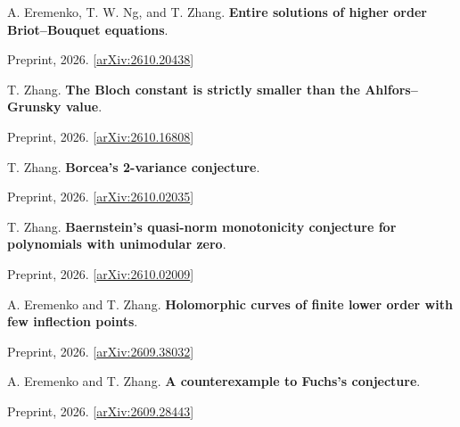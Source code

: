 \documentclass[11pt,letterpaper]{article}
\begin{document}
\begin{enumerate}[label={[\arabic*]},series=preprints]
\raggedright

\item \begin{minipage}[t]{\linewidth}\raggedright A. Eremenko, T. W. Ng, and T. Zhang. \textbf{Entire solutions of higher order Briot--Bouquet equations}.\par Preprint, 2026. [\href{https://arxiv.org/abs/2610.20438}{arXiv:2610.20438}]\end{minipage}

\item \begin{minipage}[t]{\linewidth}\raggedright T. Zhang. \textbf{The Bloch constant is strictly smaller than the Ahlfors--Grunsky value}.\par Preprint, 2026. [\href{https://arxiv.org/abs/2610.16808}{arXiv:2610.16808}]\end{minipage}

\item \begin{minipage}[t]{\linewidth}\raggedright T. Zhang. \textbf{Borcea's 2-variance conjecture}.\par Preprint, 2026. [\href{https://arxiv.org/abs/2610.02035}{arXiv:2610.02035}]\end{minipage}

\item \begin{minipage}[t]{\linewidth}\raggedright T. Zhang. \textbf{Baernstein's quasi-norm monotonicity conjecture for polynomials with unimodular zero}.\par Preprint, 2026. [\href{https://arxiv.org/abs/2610.02009}{arXiv:2610.02009}]\end{minipage}

\item \begin{minipage}[t]{\linewidth}\raggedright A. Eremenko and T. Zhang. \textbf{Holomorphic curves of finite lower order with few inflection points}.\par Preprint, 2026. [\href{https://arxiv.org/abs/2609.38032}{arXiv:2609.38032}]\end{minipage}

\item \begin{minipage}[t]{\linewidth}\raggedright A. Eremenko and T. Zhang. \textbf{A counterexample to Fuchs's conjecture}.\par Preprint, 2026. [\href{https://arxiv.org/abs/2609.28443}{arXiv:2609.28443}]\end{minipage}


\end{enumerate}
\end{document}
